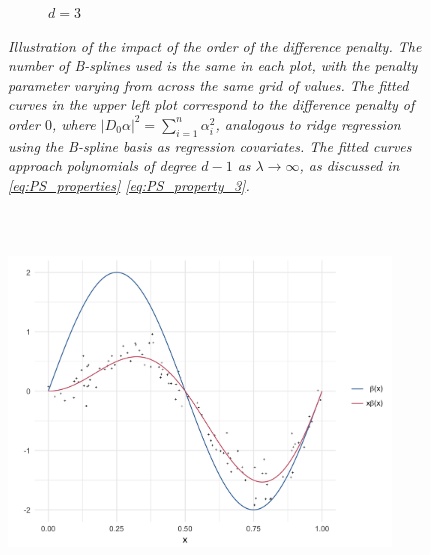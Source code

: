 \documentclass[12pt]{article}
\begin{document}
\begin{figure}[H]
\begin{subfigure}{.5\textwidth}
\caption{$d=3$}
\end{subfigure}
\caption{\textit{Illustration of the impact of the order of the difference penalty. The number of B-splines used is the same in each plot, with the penalty parameter varying from across the same grid of values. The fitted curves in the upper left plot correspond to the difference penalty of order $0$, where $\vert D_0 \alpha \vert^2 = \sum_{i=1}^n \alpha_i^2$, analogous to ridge regression using the B-spline basis as regression covariates. The fitted curves approach polynomials of degree $d-1$ as $\lambda \rightarrow \infty$, as discussed in \ref{eq:PS_properties} \ref{eq:PS_property_3}.}}
\label{fig:PS_penalty_section_figure_6}
\end{figure}




\begin{figure}[h]
\centering
 \graphicspath{{img/}}
  \includegraphics[width=4in, height=4in]{PS_penalty_section_figure_5.png}
\end{figure}




\end{document}
